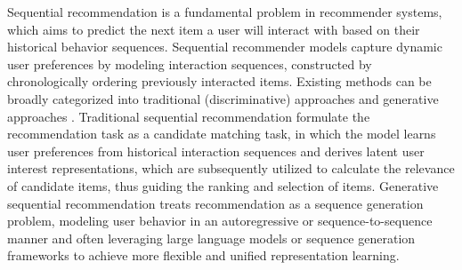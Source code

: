 \documentclass[sigconf,natbib=true]{acmart}
\begin{document}

Sequential recommendation \cite{seqrec_study, pan2026survey, wei2025sequential} is a fundamental problem in recommender systems, which aims to predict the next item a user will interact with based on their historical behavior sequences. Sequential recommender models \cite{fpmc, covington2016deep, shah2025dsrs, he2016fusing} capture dynamic user preferences by modeling interaction sequences, constructed by chronologically ordering previously interacted items. Existing methods can be broadly categorized into traditional (discriminative) approaches \cite{elecrec} and generative approaches \cite{xiao2025unger}. Traditional sequential recommendation \cite{gru4rec, caser, sasrec, bert4rec} formulate the recommendation task as a candidate matching task, in which the model learns user preferences from historical interaction sequences and derives latent user interest representations, which are subsequently utilized to calculate the relevance of candidate items, thus guiding the ranking and selection of items. Generative sequential recommendation \cite{www25-gen-rec-tutorial, hou2025survey} treats recommendation as a sequence generation problem, modeling user behavior in an autoregressive or sequence-to-sequence manner and often leveraging large language models \cite{p5, gptrec} or sequence generation frameworks \cite{tiger, hstu} to achieve more flexible and unified representation learning.

\end{document}
